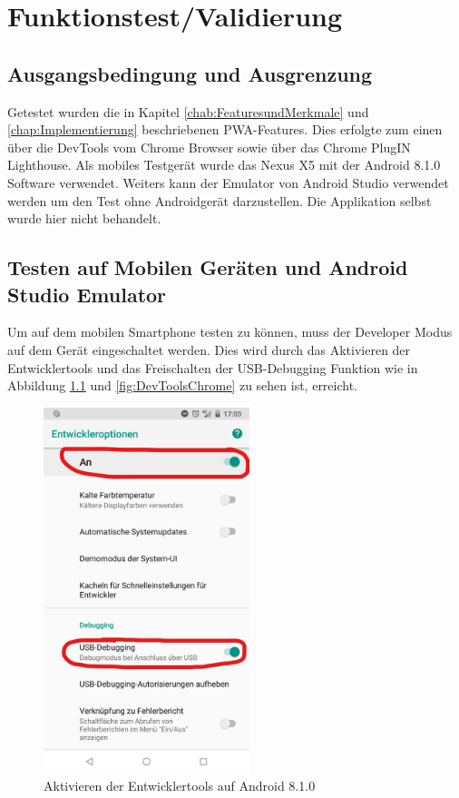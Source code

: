\chapter{Funktionstest/Validierung}\label{chap:Funktionstest}
\thispagestyle{standard}
\pagestyle{standard}

\section{Ausgangsbedingung und Ausgrenzung}
Getestet wurden die in Kapitel \ref{chab:FeaturesundMerkmale} und \ref{chap:Implementierung} beschriebenen PWA-Features. Dies erfolgte zum einen über die DevTools vom Chrome Browser sowie über das Chrome PlugIN Lighthouse. 
Als mobiles Testgerät wurde das Nexus X5 mit der Android 8.1.0 Software verwendet.  
Weiters kann der Emulator von Android Studio verwendet werden um den Test ohne Androidgerät darzustellen. Die Applikation selbst wurde hier nicht behandelt.
 
\section{Testen auf Mobilen Geräten und Android Studio Emulator}
Um auf dem mobilen Smartphone testen zu können, muss der Developer Modus auf dem Gerät eingeschaltet werden. Dies wird durch das Aktivieren der Entwicklertools und das Freischalten der USB-Debugging Funktion wie in Abbildung \ref{fig:DevToolsAndorid} und \ref{fig:DevToolsChrome} zu sehen ist, erreicht. 

\begin{figure}[h]
	\centering
	\includegraphics[width=6cm]{BilderAllgemein/DevToolsAndroid}\medskip
	\caption{Aktivieren der Entwicklertools auf Android 8.1.0}
	\label{fig:DevToolsAndorid}
\end{figure}

